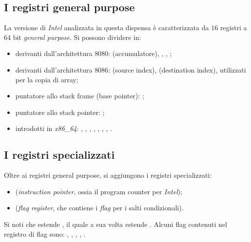 \documentclass[class=book, crop=false, oneside]{standalone}
\begin{document}
\subsection{I registri general purpose}
La versione di \emph{Intel} analizzata in questa dispensa è caratterizzata da \(16\) registri a 64 bit \emph{general purpose}. Si possono dividere in:
\begin{itemize}
	\item derivanti dall'architettura \(8080\):  (accumulatore), , , ;
	\item derivanti dall'architettura \(8086\):  (source index),  (destination index), utilizzati per la copia di array;
	\item puntatore allo stack frame (base pointer): ;
	\item puntatore allo stack pointer: ;
	\item introdotti in \emph{x86\_64}: , , , , , , , .
\end{itemize}

\subsection{I registri specializzati}
Oltre ai registri general purpose, si aggiungono i registri specializzati:
\begin{itemize}
	\item {} (\emph{instruction pointer}, ossia il program counter per \emph{Intel});
	\item {} (\emph{flag register}, che contiene i \emph{flag} per i salti condizionali).
\end{itemize}
Si noti che  estende , il quale a sua volta estende . Alcuni flag contenuti nel registro di flag sono: , , , , .
\end{document}
